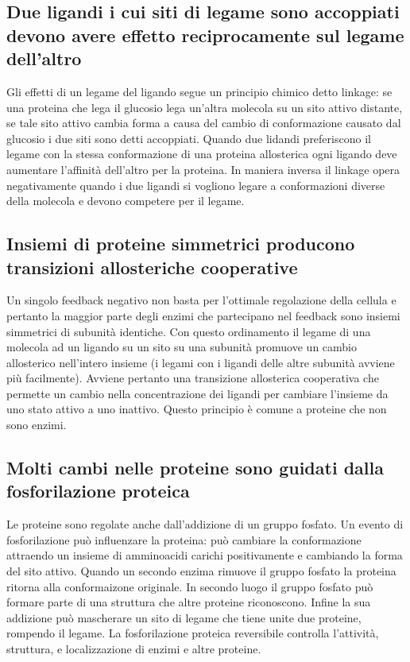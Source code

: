 \subsection{Due ligandi i cui siti di legame sono accoppiati devono avere effetto reciprocamente sul legame dell'altro}
Gli effetti di un legame del ligando segue un principio chimico detto linkage: se una proteina che lega il glucosio lega un'altra molecola su un sito attivo distante, se tale sito
attivo cambia forma a causa del cambio di conformazione causato dal glucosio i due siti sono detti accoppiati. Quando due lidandi preferiscono il legame con la stessa conformazione di
una proteina allosterica ogni ligando deve aumentare l'affinit\`a dell'altro per la proteina. In maniera inversa il linkage opera negativamente quando i due ligandi si vogliono legare
a conformazioni diverse della molecola e devono competere per il legame. 
\subsection{Insiemi di proteine simmetrici producono transizioni allosteriche cooperative}
Un singolo feedback negativo non basta per l'ottimale regolazione della cellula e pertanto la maggior parte degli enzimi che partecipano nel feedback sono insiemi simmetrici di 
subunit\`a identiche. Con questo ordinamento il legame di una molecola ad un ligando su un sito su una subunit\`a promuove un cambio allosterico nell'intero insieme (i legami con i 
ligandi delle altre subunit\`a avviene pi\`u facilmente). Avviene pertanto una transizione allosterica cooperativa che permette un cambio nella concentrazione dei ligandi per cambiare 
l'insieme da uno stato attivo a uno inattivo. Questo principio \`e comune a proteine che non sono enzimi. 
\subsection{Molti cambi nelle proteine sono guidati dalla fosforilazione proteica}
Le proteine sono regolate anche dall'addizione di un gruppo fosfato. Un evento di fosforilazione pu\`o influenzare la proteina: pu\`o cambiare la conformazione attraendo un insieme
di amminoacidi carichi positivamente e cambiando la forma del sito attivo. Quando un secondo enzima rimuove il gruppo fosfato la proteina ritorna alla conformaizone originale. In 
secondo luogo il gruppo fosfato pu\`o formare parte di una struttura che altre proteine riconoscono. Infine la sua addizione pu\`o mascherare un sito di legame che tiene unite 
due proteine, rompendo il legame. La fosforilazione proteica reversibile controlla l'attivit\`a, struttura, e localizzazione di enzimi e altre proteine. 
